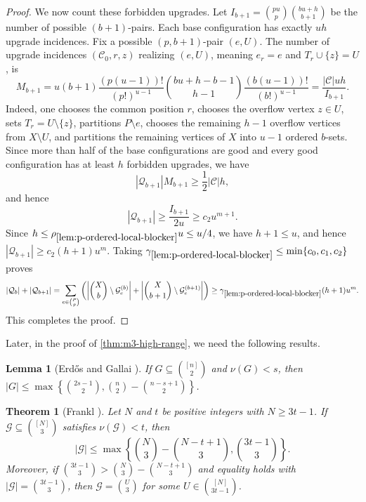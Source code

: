 \documentclass[10pt,a4paper]{article}
\numberwithin{equation}{section}
\newtheorem{theorem}{Theorem}[section]
\newtheorem{lemma}[lemma]{Lemma}
\theoremstyle{definition}
\newcommand{\G}{\mathcal G}
\begin{document}
\begin{proof}
        We now count these forbidden upgrades.
        Let $I_{b+1}=\binom{pu}{p}\binom{bu+h}{b+1}$ be the number of possible $(b+1)$-pairs.
        Each base configuration has exactly $uh$ upgrade incidences.
        Fix a possible $(p,b+1)$-pair $(e,U)$. The number of upgrade incidences $(\mathcal C_0,r,z)$ realizing $(e,U)$, meaning $e_r=e$ and $T_r\cup\{z\}=U$, is
        \[
                M_{b+1}
                =
                u(b+1)\frac{(p(u-1))!}{(p!)^{u-1}}\binom{bu+h-b-1}{h-1}\frac{(b(u-1))!}{(b!)^{u-1}}
                =
                \frac{|\mathcal C|uh}{I_{b+1}}.
        \]
        Indeed, one chooses the common position $r$, chooses the overflow vertex $z\in U$, sets $T_r=U\setminus\{z\}$, partitions $P\setminus e$, chooses the remaining $h-1$ overflow vertices from $X\setminus U$, and partitions the remaining vertices of $X$ into $u-1$ ordered $b$-sets.
        Since more than half of the base configurations are good and every good configuration has at least $h$ forbidden upgrades, we have
        \[
                |\mathcal Q_{b+1}|
                M_{b+1}
                \ge
                \frac12|\mathcal C|h,
        \]
        and hence
        \[
                |\mathcal Q_{b+1}|
                \ge
                \frac{I_{b+1}}{2u}
                \ge c_2 u^{m+1}.
        \]
        Since $h\le \rho_{\ref{lem:p-ordered-local-blocker}}u\le u/4$, we have $h+1\le u$, and hence $|\mathcal Q_{b+1}| \ge c_2(h+1)u^m$.
        Taking $\gamma_{\ref{lem:p-ordered-local-blocker}}\le \min\{c_0,c_1,c_2\}$ proves
        \[
                |\mathcal Q_b|+|\mathcal Q_{b+1}|
                =
                \sum_{e\in\binom Pp}
                \left(
                \left|\binom Xb\setminus\G_e^{(b)}\right|
                +
                \left|\binom X{b+1}\setminus\G_e^{(b+1)}\right|
                \right)
                \ge
                \gamma_{\ref{lem:p-ordered-local-blocker}}(h+1)u^m.
        \]
        This completes the proof.
\end{proof}

Later, in the proof of \cref{thm:m3-high-range}, we need the following results.

\begin{lemma}[Erd\H{o}s and Gallai \cite{ErdosGallai}]\label{lem:EG}
        If $G\subseteq\binom{[n]}2$ and $\nu(G)<s$, then $|G|\le\max\left\{\binom{2s-1}{2},\binom n2-\binom{n-s+1}{2}\right\}$.
\end{lemma}

\begin{theorem}[Frankl \cite{FranklDAM}]
        \label{thm:EMC3}
        Let $N$ and $t$ be positive integers with $N\ge3t-1$.
        If $\G\subseteq\binom{[N]}3$ satisfies $\nu(\G)<t$, then
        \[
                |\G|\le
                \max\left\{\binom N3-\binom{N-t+1}3,\binom{3t-1}3\right\}.
        \]
        Moreover, if $\binom{3t-1}3>\binom N3-\binom{N-t+1}3$ and equality holds with $|\G|=\binom{3t-1}3$, then $\G=\binom U3$ for some $U\in\binom{[N]}{3t-1}$.
\end{theorem}
\end{document}
